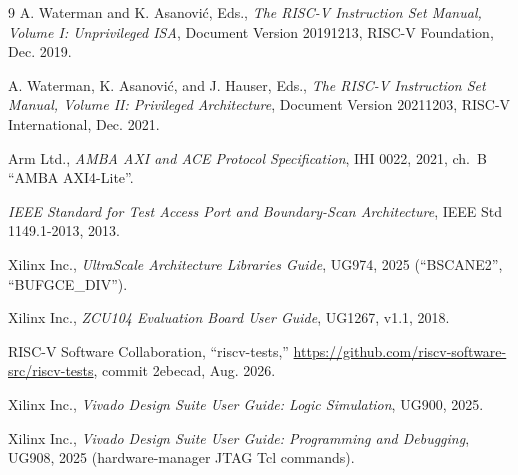 \documentclass[journal,10pt]{IEEEtran}
\begin{document}
\begin{thebibliography}{9}
 A. Waterman and K. Asanovi\'c, Eds., \emph{The RISC-V
Instruction Set Manual, Volume I: Unprivileged ISA}, Document Version
20191213, RISC-V Foundation, Dec. 2019.

 A. Waterman, K. Asanovi\'c, and J. Hauser, Eds.,
\emph{The RISC-V Instruction Set Manual, Volume II: Privileged
Architecture}, Document Version 20211203, RISC-V International, Dec. 2021.

 Arm Ltd., \emph{AMBA AXI and ACE Protocol Specification},
IHI 0022, 2021, ch.~B ``AMBA AXI4-Lite''.

 \emph{IEEE Standard for Test Access Port and Boundary-Scan
Architecture}, IEEE Std 1149.1-2013, 2013.

 Xilinx Inc., \emph{UltraScale Architecture Libraries Guide},
UG974, 2025 (``BSCANE2'', ``BUFGCE\_DIV'').

 Xilinx Inc., \emph{ZCU104 Evaluation Board User Guide},
UG1267, v1.1, 2018.

 RISC-V Software Collaboration, ``riscv-tests,''
\url{https://github.com/riscv-software-src/riscv-tests}, commit 2ebecad,
Aug. 2026.

 Xilinx Inc., \emph{Vivado Design Suite User Guide: Logic
Simulation}, UG900, 2025.

 Xilinx Inc., \emph{Vivado Design Suite User Guide:
Programming and Debugging}, UG908, 2025 (hardware-manager JTAG Tcl commands).
\end{thebibliography}
\end{document}
